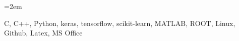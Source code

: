 \documentclass[xcolor=dvipsnames]{scrartcl}
\newcommand{\MarginText}[1]{\marginpar{\raggedleft\itshape\small#1}} %
\newcommand{\Description}[1]{\hangindent=2em\hangafter=0\noindent\raggedright\footnotesize{#1}\par\normalsize\vspace{1em}} %
\begin{document}
\begin{cv}{}
\noindent{}\vspace{0.5em}

\Description{C, C++, Python, keras, tensorflow, scikit-learn, MATLAB, ROOT, Linux, Github, Latex, MS Office}



\vspace{1em} %


\noindent{}\vspace{0.5em}










\vspace{1em}

\newlength{\langbox} %
\settowidth{\langbox}{English} %


\end{cv}
\end{document}
